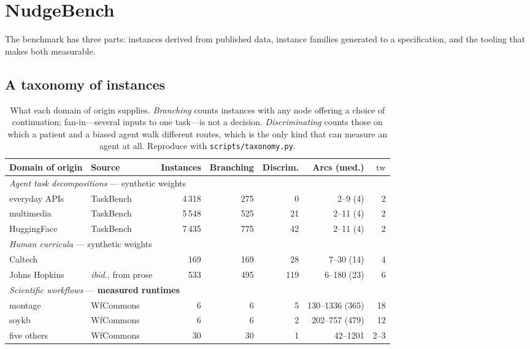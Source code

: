 \documentclass{article}
\newcommand{\tw}{\mathrm{tw}}
\begin{document}
\section{NudgeBench}
\label{sec:bench}

The benchmark has three parts: instances derived from published data, instance
families generated to a specification, and the tooling that makes both measurable.

\subsection{A taxonomy of instances}

\begin{table}[t]
\caption{What each domain of origin supplies. \emph{Branching} counts instances
with any node offering a choice of continuation; fan-in---several inputs to one
task---is not a decision. \emph{Discriminating} counts those on which a patient and
a biased agent walk different routes, which is the only kind that can measure an
agent at all. Reproduce with \texttt{scripts/taxonomy.py}.}
\label{tab:corpus}
\centering
\small
\begin{tabular}{llrrrrr}
\toprule
Domain of origin & Source & Instances & Branching & Discrim. & Arcs (med.) & $\tw$ \\
\midrule
\multicolumn{7}{l}{\emph{Agent task decompositions} --- synthetic weights} \\
\quad everyday APIs   & TaskBench~\cite{taskbench} & 4\,318 &   275 &   0 & 2--9 (4)     & 2 \\
\quad multimedia      & TaskBench                  & 5\,548 &   525 &  21 & 2--11 (4)    & 2 \\
\quad HuggingFace     & TaskBench                  & 7\,435 &   775 &  42 & 2--11 (4)    & 2 \\
\midrule
\multicolumn{7}{l}{\emph{Human curricula} --- synthetic weights} \\
\quad Caltech         & \cite{stavrinides2023}     &   169 &   169 &  28 & 7--30 (14)   & 4 \\
\quad Johns Hopkins   & \emph{ibid.}, from prose   &   533 &   495 & 119 & 6--180 (23)  & 6 \\
\midrule
\multicolumn{7}{l}{\emph{Scientific workflows} --- \textbf{measured runtimes}} \\
\quad montage         & WfCommons~\cite{wfcommons} &     6 &     6 &   5 & 130--1336 (365) & 18 \\
\quad soykb           & WfCommons                  &     6 &     6 &   2 & 202--757 (479)  & 12 \\
\quad five others     & WfCommons                  &    30 &    30 &   1 & 42--1201        & 2--3 \\
\bottomrule
\end{tabular}
\end{table}
\end{document}
